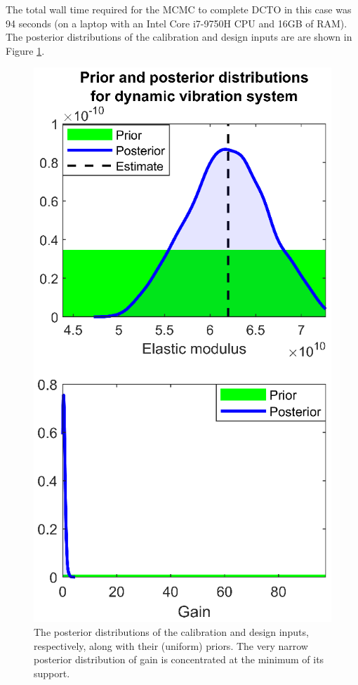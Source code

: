 \documentclass[10pt]{asme2ej}
\begin{document}
%
The total wall time required for the MCMC to complete DCTO in this case was 94 seconds (on a laptop with an Intel Core i7-9750H CPU and 16GB of RAM).
%
The posterior distributions of the calibration and design inputs are are shown in Figure \ref{fig:dvs_calib_and_design}.
%
\begin{figure}
	\centering
	\includegraphics[scale=0.85]{figures/figure_11.eps}
	\captionsetup{width=.85\linewidth}
	\caption{The posterior distributions of the calibration and design inputs, respectively, along with their (uniform) priors. The very narrow posterior distribution of gain is concentrated at the minimum of its support.}
	\label{fig:dvs_calib_and_design}
\end{figure}
\end{document}
